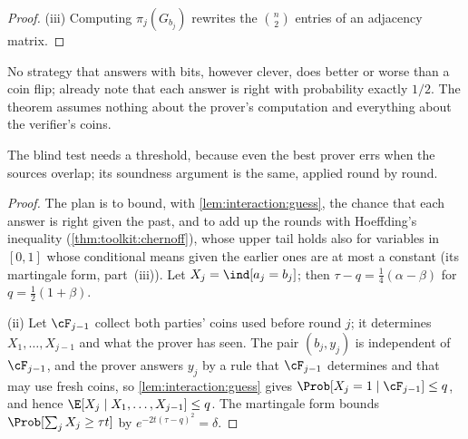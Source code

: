 \begin{refsection}
\begin{proof}
(iii) Computing $\pi_j(G_{b_j})$ rewrites the $\binom n2$ entries of an adjacency matrix.
\end{proof}

No strategy that answers with bits, however clever, does better or worse than a coin flip; \textcite[footnote~4]{GoldreichMicaliWigderson1991} already note that each answer is right with probability exactly $1/2$. The theorem assumes nothing about the prover's computation and everything about the verifier's coins.

The blind test needs a threshold, because even the best prover errs when the sources overlap; its soundness argument is the same, applied round by round.


\begin{proof}
The plan is to bound, with \cref{lem:interaction:guess}, the chance that each answer is right given the past, and to add up the rounds with Hoeffding's inequality (\cref{thm:toolkit:chernoff}), whose upper tail holds also for variables in $[0,1]$ whose conditional means given the earlier ones are at most a constant (its martingale form, part~(iii)). Let $X_j=\ind[a_j=b_j]$; then $\tau-q=\frac14(\alpha-\beta)$ for $q=\frac12(1+\beta)$.

(ii) Let $\cF_{j-1}$ collect both parties' coins used before round $j$; it determines $X_1,\dots,X_{j-1}$ and what the prover has seen. The pair $(b_j,y_j)$ is independent of $\cF_{j-1}$, and the prover answers $y_j$ by a rule that $\cF_{j-1}$ determines and that may use fresh coins, so \cref{lem:interaction:guess} gives $\Prob[X_j=1\mid\cF_{j-1}]\le q$, and hence $\E[X_j\mid X_1,\dots,X_{j-1}]\le q$. The martingale form bounds $\Prob[\sum_jX_j\ge\tau t]$ by $e^{-2t(\tau-q)^2}=\delta$.


\end{proof}
\end{refsection}
